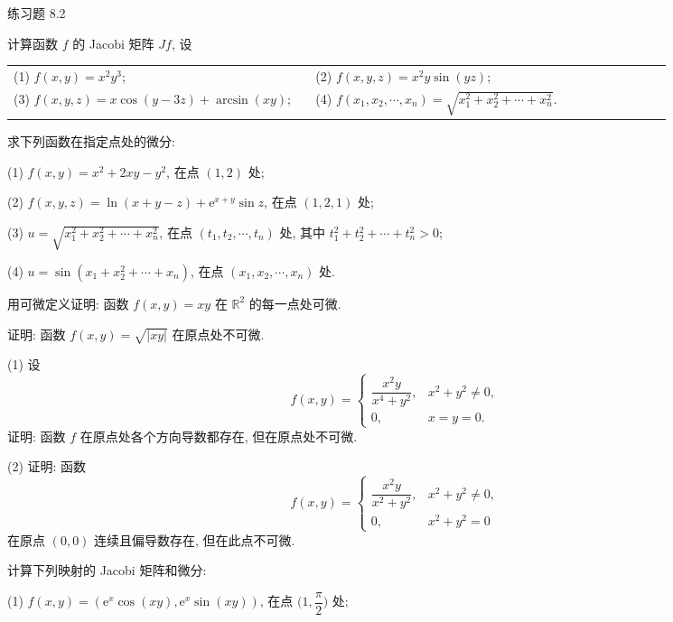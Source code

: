 \begin{exblock}{练习题 8.2}
  \item 计算函数 $f$ 的 Jacobi 矩阵 $Jf$, 设

  \begin{tabular}{@{}p{0.44\linewidth}p{0.52\linewidth}@{}}
    (1) $f(x, y) = x^{2}y^{3}$; & (2) $f(x, y, z) = x^{2}y\sin(yz)$; \\
    (3) $f(x, y, z) = x\cos(y - 3z) + \arcsin(xy)$; & (4) $f(x_{1}, x_{2}, \cdots, x_{n}) = \sqrt{x_{1}^{2} + x_{2}^{2} + \cdots + x_{n}^{2}}$.
  \end{tabular}

  \item 求下列函数在指定点处的微分:

  (1) $f(x, y) = x^{2} + 2xy - y^{2}$, 在点 $(1, 2)$ 处;

  (2) $f(x, y, z) = \ln(x + y - z) + \mathrm{e}^{x + y}\sin z$, 在点 $(1, 2, 1)$ 处;

  (3) $u = \sqrt{x_{1}^{2} + x_{2}^{2} + \cdots + x_{n}^{2}}$, 在点 $(t_{1}, t_{2}, \cdots, t_{n})$ 处, 其中 $t_{1}^{2} + t_{2}^{2} + \cdots + t_{n}^{2} > 0$;

  (4) $u = \sin(x_{1} + x_{2}^{2} + \cdots + x_{n})$, 在点 $(x_{1}, x_{2}, \cdots, x_{n})$ 处.

  \item 用可微定义证明: 函数 $f(x, y) = xy$ 在 $\mathbb{R}^{2}$ 的每一点处可微.

  \item 证明: 函数 $f(x, y) = \sqrt{|xy|}$ 在原点处不可微.

  \item (1) 设
  \[
    f(x, y) = \begin{cases}
      \dfrac{x^{2}y}{x^{4} + y^{2}}, & x^{2} + y^{2} \neq 0, \\[2.5mm]
      0, & x = y = 0.
    \end{cases}
  \]
  证明: 函数 $f$ 在原点处各个方向导数都存在, 但在原点处不可微.

  (2) 证明: 函数
  \[
    f(x, y) = \begin{cases}
      \dfrac{x^{2}y}{x^{2} + y^{2}}, & x^{2} + y^{2} \neq 0, \\[2.5mm]
      0, & x^{2} + y^{2} = 0
    \end{cases}
  \]
  在原点 $(0, 0)$ 连续且偏导数存在, 但在此点不可微.

  \item 计算下列映射的 Jacobi 矩阵和微分:

  (1) $f(x, y) = (\mathrm{e}^{x}\cos(xy), \mathrm{e}^{x}\sin(xy))$, 在点 $\Big(1, \dfrac{\pi}{2}\Big)$ 处;


\end{exblock}
